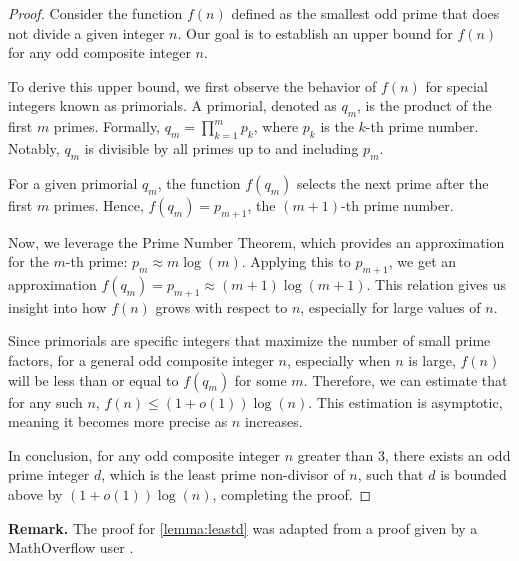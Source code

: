 \documentclass{article}
\theoremstyle{plain}
\theoremstyle{definition}
\begin{document}
\begin{proof}
Consider the function \( f(n) \) defined as the smallest odd prime that does not divide a given integer \( n \). Our goal is to establish an upper bound for \( f(n) \) for any odd composite integer \( n \).

To derive this upper bound, we first observe the behavior of \( f(n) \) for special integers known as primorials. A primorial, denoted as \( q_m \), is the product of the first \( m \) primes. Formally, \( q_m = \prod_{k=1}^{m} p_k \), where \( p_k \) is the \( k \)-th prime number. Notably, \( q_m \) is divisible by all primes up to and including \( p_m \).

For a given primorial \( q_m \), the function \( f(q_m) \) selects the next prime after the first \( m \) primes. Hence, \( f(q_m) = p_{m+1} \), the \( (m+1) \)-th prime number. 

Now, we leverage the Prime Number Theorem, which provides an approximation for the \( m \)-th prime: \( p_m \approx m \log(m) \). Applying this to \( p_{m+1} \), we get an approximation \( f(q_m) = p_{m+1} \approx (m+1) \log(m+1) \). This relation gives us insight into how \( f(n) \) grows with respect to \( n \), especially for large values of \( n \).

Since primorials are specific integers that maximize the number of small prime factors, for a general odd composite integer \( n \), especially when \( n \) is large, \( f(n) \) will be less than or equal to \( f(q_m) \) for some \( m \). Therefore, we can estimate that for any such \( n \), \( f(n) \leq (1 + o(1)) \log(n) \). This estimation is asymptotic, meaning it becomes more precise as \( n \) increases.

In conclusion, for any odd composite integer \( n \) greater than 3, there exists an odd prime integer \( d \), which is the least prime non-divisor of \( n \), such that \( d \) is bounded above by \( (1 + o(1)) \log(n) \), completing the proof.
\end{proof}

\textbf{Remark.} The proof for \cref{lemma:leastd} was adapted from a proof given by a MathOverflow user \cite{leastcoprime2021}.
\end{document}
